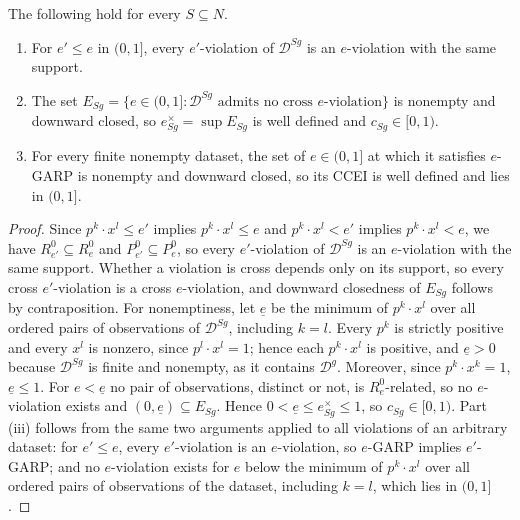 \documentclass[11 pt]{article}
\begin{document}
\begin{lemma}\label{lem:app_persist}
The following hold for every $S \subseteq N$.
\begin{enumerate}
\item[(i)] For $e' \leq e$ in $(0,1]$, every $e'$-violation of $\mathcal{D}^{Sg}$ is an $e$-violation with the same support.
\item[(ii)] The set $E_{Sg} = \{ e \in (0,1] : \mathcal{D}^{Sg} \text{ admits no cross } e\text{-violation} \}$ is nonempty and downward closed, so $e^{\times}_{Sg} = \sup E_{Sg}$ is well defined and $c_{Sg} \in [0,1)$.
\item[(iii)] For every finite nonempty dataset, the set of $e \in (0,1]$ at which it satisfies $e$-GARP is nonempty and downward closed, so its CCEI is well defined and lies in $(0,1]$.
\end{enumerate}
\end{lemma}

\begin{proof}
Since $p^{k} \cdot x^{l} \leq e'$ implies $p^{k} \cdot x^{l} \leq e$ and $p^{k} \cdot x^{l} < e'$ implies $p^{k} \cdot x^{l} < e$, we have $R^{0}_{e'} \subseteq R^{0}_{e}$ and $P^{0}_{e'} \subseteq P^{0}_{e}$, so every $e'$-violation of $\mathcal{D}^{Sg}$ is an $e$-violation with the same support. Whether a violation is cross depends only on its support, so every cross $e'$-violation is a cross $e$-violation, and downward closedness of $E_{Sg}$ follows by contraposition. For nonemptiness, let $\underline{e}$ be the minimum of $p^{k} \cdot x^{l}$ over all ordered pairs of observations of $\mathcal{D}^{Sg}$, including $k = l$. Every $p^{k}$ is strictly positive and every $x^{l}$ is nonzero, since $p^{l} \cdot x^{l} = 1$; hence each $p^{k} \cdot x^{l}$ is positive, and $\underline{e} > 0$ because $\mathcal{D}^{Sg}$ is finite and nonempty, as it contains $\mathcal{D}^{g}$. Moreover, since $p^{k} \cdot x^{k} = 1$, $\underline{e} \leq 1$. For $e < \underline{e}$ no pair of observations, distinct or not, is $\mathrel{R^{0}_{e}}$-related, so no $e$-violation exists and $(0, \underline{e}) \subseteq E_{Sg}$. Hence $0 < \underline{e} \leq e^{\times}_{Sg} \leq 1$, so $c_{Sg} \in [0,1)$. Part (iii) follows from the same two arguments applied to all violations of an arbitrary dataset: for $e' \leq e$, every $e'$-violation is an $e$-violation, so $e$-GARP implies $e'$-GARP; and no $e$-violation exists for $e$ below the minimum of $p^{k} \cdot x^{l}$ over all ordered pairs of observations of the dataset, including $k = l$, which lies in $(0,1]$.
\end{proof}
\end{document}
